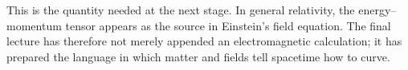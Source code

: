 This is the quantity needed at the next stage. In general relativity,
the energy--momentum tensor appears as the source in Einstein's field
equation. The final lecture has therefore not merely appended an
electromagnetic calculation; it has prepared the language in which
matter and fields tell spacetime how to curve.
